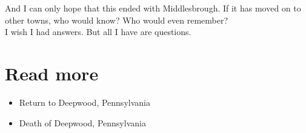 \documentclass[a5paper]{scrartcl}
\begin{document}
And I can only hope that this ended with Middlesbrough. If it has moved on to other towns, who would know? Who would even remember? \\


I wish I had answers. But all I have are questions.

\section*{Read more}

\begin{itemize}
    \item Return to Deepwood, Pennsylvania
    \item Death of Deepwood, Pennsylvania
\end{itemize}
\end{document}
